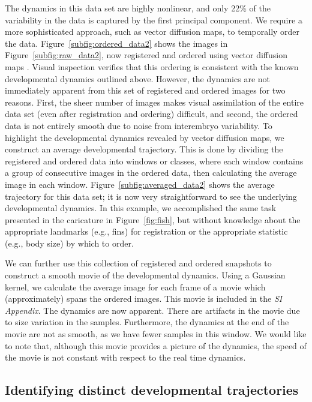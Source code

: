 \documentclass{pnastwo}
\begin{document}
\begin{article}
The dynamics in this data set are highly nonlinear, and only 22\% of the variability in the data is captured by the first principal component.
%
We require a more sophisticated approach, such as vector diffusion maps, to temporally order the data.
%
Figure~\ref{subfig:ordered_data2} shows the images in Figure~\ref{subfig:raw_data2}, now registered and ordered using vector diffusion maps \cite{singer2012vector}.
%
Visual inspection verifies that this ordering is consistent with the known developmental dynamics outlined above.
%
However, the dynamics are not immediately apparent from this set of registered and ordered images for two reasons.
%
First, the sheer number of images makes visual assimilation of the entire data set (even after registration and ordering) difficult, and
second, the ordered data is not entirely smooth due to noise from interembryo variability.
%
To highlight the developmental dynamics revealed by vector diffusion maps, we construct an average developmental trajectory.
%
This is done by dividing the registered and ordered data into windows or classes, where each window contains a group of consecutive images in the ordered data, then calculating the average image in each window.
%
Figure~\ref{subfig:averaged_data2} shows the average trajectory for this data set; it is now very straightforward to see the underlying developmental dynamics.
%
In this example, we accomplished the same task presented in the caricature in Figure~\ref{fig:fish}, but without knowledge about the appropriate landmarks (e.g., fins) for registration or the appropriate statistic (e.g., body size) by which to order. 

We can further use this collection of registered and ordered snapshots to construct a smooth movie of the developmental dynamics. 
%
Using a Gaussian kernel, we calculate the average image for each frame of a movie which (approximately) spans the ordered images. 
%
This movie is included in the {\it SI Appendix}.
%
The dynamics are now apparent.
%
There are artifacts in the movie due to size variation in the samples.
%
Furthermore, the dynamics at the end of the movie are not as smooth, as we have fewer samples in this window. 
%
We would like to note that, although this movie provides a picture of the dynamics, the speed of the movie is not constant with respect to the real time dynamics. 


\subsection{Identifying distinct developmental trajectories}



\end{article}
\end{document}
